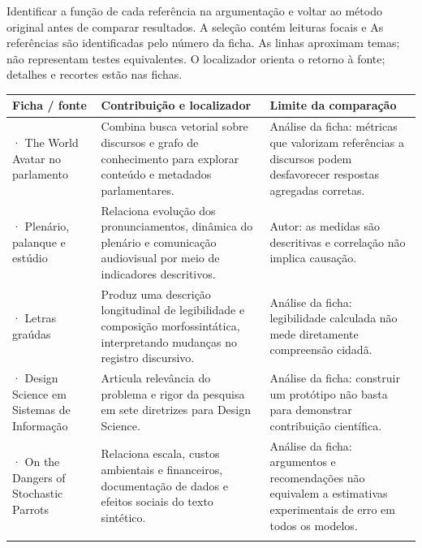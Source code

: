 Identificar a função de cada referência na argumentação e voltar ao método original antes de comparar resultados. A seleção contém leituras focais e
\clearpage
{}
As referências são identificadas pelo número da ficha. As linhas aproximam temas; não representam testes equivalentes. O localizador orienta o retorno à fonte; detalhes e recortes estão nas fichas.

{\small\renewcommand{\arraystretch}{1.3}
\begin{tabularx}{\textwidth}{@{}>{\raggedright\arraybackslash}p{29mm}>{\raggedright\arraybackslash}X>{\raggedright\arraybackslash}X@{}}
\toprule
\textbf{Ficha / fonte} & \textbf{Contribuição e localizador} & \textbf{Limite da comparação}\\
\midrule
16 · The World Avatar no parlamento & Combina busca vetorial sobre discursos e grafo de conhecimento para explorar conteúdo e metadados parlamentares.\par\smallskip{\footnotesize Discussão} & Análise da ficha: métricas que valorizam referências a discursos podem desfavorecer respostas agregadas corretas.\\
\addlinespace[5pt]
17 · Plenário, palanque e estúdio & Relaciona evolução dos pronunciamentos, dinâmica do plenário e comunicação audiovisual por meio de indicadores descritivos.\par\smallskip{\footnotesize Discussão} & Autor: as medidas são descritivas e correlação não implica causação.\\
\addlinespace[5pt]
18 · Letras graúdas & Produz uma descrição longitudinal de legibilidade e composição morfossintática, interpretando mudanças no registro discursivo.\par\smallskip{\footnotesize Procedimentos de seleção} & Análise da ficha: legibilidade calculada não mede diretamente compreensão cidadã.\\
\addlinespace[5pt]
43 · Design Science em Sistemas de Informação & Articula relevância do problema e rigor da pesquisa em sete diretrizes para Design Science.\par\smallskip{\footnotesize Tabela 1, diretriz 1} & Análise da ficha: construir um protótipo não basta para demonstrar contribuição científica.\\
\addlinespace[5pt]
44 · On the Dangers of Stochastic Parrots & Relaciona escala, custos ambientais e financeiros, documentação de dados e efeitos sociais do texto sintético.\par\smallskip{\footnotesize Introdução} & Análise da ficha: argumentos e recomendações não equivalem a estimativas experimentais de erro em todos os modelos.\\
\addlinespace[5pt]
\bottomrule
\end{tabularx}}

